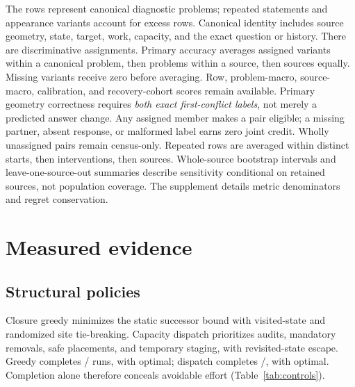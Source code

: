 \documentclass[10pt,twocolumn,letterpaper]{article}
\begin{document}
The \ProbeCount{} rows represent \ProblemCount{} canonical diagnostic
problems; repeated statements and appearance variants account for
\RepeatedRowCount{} excess rows. Canonical identity includes source geometry, state,
target, work, capacity, and the exact question or history.
There are \DiscriminativeCount{} discriminative assignments.
Primary accuracy averages assigned variants within a canonical problem,
then problems within a source, then sources equally. Missing variants
receive zero before averaging. Row, problem-macro, source-macro,
calibration, and recovery-cohort scores remain available. Primary geometry
correctness requires \emph{both exact first-conflict labels}, not merely
a predicted answer change. Any assigned member makes a pair eligible;
a missing partner, absent response, or malformed label earns zero joint
credit. Wholly unassigned pairs remain census-only. Repeated rows are
averaged within distinct starts, then interventions, then sources.
Whole-source bootstrap intervals and leave-one-source-out summaries
describe sensitivity conditional on retained sources, not population coverage.
The supplement details metric denominators and regret conservation.

\section{Measured evidence}
\begin{table}[t]
\centering\small
\caption{Structural controls on \EpisodeCount{} episodes. The oracle
uses one seed; other policies use three tie-order seeds (\PolicyRuns{}
runs). Regret is mean excess among successes. Exact relations are
privileged inputs, so these are not image-input VLM results.}

\label{tab:controls}
\end{table}

\subsection{Structural policies}
Closure greedy minimizes the static successor bound with visited-state
and randomized site tie-breaking. Capacity dispatch prioritizes audits,
mandatory removals, safe placements, and temporary staging, with
revisited-state escape. Greedy completes \GreedyCompleted{}/\GreedyAssigned{}
runs, with \GreedyOptimal{} optimal; dispatch completes
\DispatchCompleted{}/\DispatchAssigned{}, with \DispatchOptimal{} optimal.
Completion alone
therefore conceals avoidable effort (Table~\ref{tab:controls}).
\end{document}
